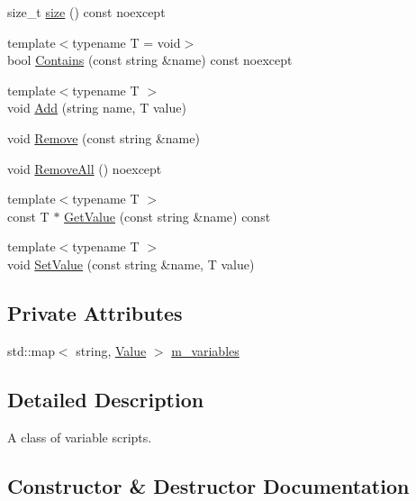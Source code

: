 \begin{DoxyCompactItemize}
size\+\_\+t \mbox{\hyperlink{classmage_1_1_variable_script_a20e376c802dae71e001037afc316c795}{size}} () const noexcept
\item 
{\footnotesize template$<$typename T  = void$>$ }\\bool \mbox{\hyperlink{classmage_1_1_variable_script_a86143720f1495e20d461e0a65e2c5c8d}{Contains}} (const string \&name) const noexcept
\item 
{\footnotesize template$<$typename T $>$ }\\void \mbox{\hyperlink{classmage_1_1_variable_script_ad41e19065e7935974585a1b120ef47d4}{Add}} (string name, T value)
\item 
void \mbox{\hyperlink{classmage_1_1_variable_script_aac74a9edbe78e0caa1095ce32835501d}{Remove}} (const string \&name)
\item 
void \mbox{\hyperlink{classmage_1_1_variable_script_add51955d83e85e6d6acd82cfe40bed26}{Remove\+All}} () noexcept
\item 
{\footnotesize template$<$typename T $>$ }\\const T $\ast$ \mbox{\hyperlink{classmage_1_1_variable_script_aaed50c03f7affeeac269fbc15248caf6}{Get\+Value}} (const string \&name) const
\item 
{\footnotesize template$<$typename T $>$ }\\void \mbox{\hyperlink{classmage_1_1_variable_script_a43772c8d83466b32a6f16e5564d43026}{Set\+Value}} (const string \&name, T value)
\end{DoxyCompactItemize}
\subsection*{Private Attributes}
\begin{DoxyCompactItemize}
\item 
std\+::map$<$ string, \mbox{\hyperlink{namespacemage_aa1fe0628487e0706e44efdc62dbdb3a2}{Value}} $>$ \mbox{\hyperlink{classmage_1_1_variable_script_aed925cedf17c486fad876764e53d9e04}{m\+\_\+variables}}
\end{DoxyCompactItemize}


\subsection{Detailed Description}
A class of variable scripts. 

\subsection{Constructor \& Destructor Documentation}
\mbox{\label{classmage_1_1_variable_script_a87830f09a97aa8f7df3074029c5ab8d5}} 
